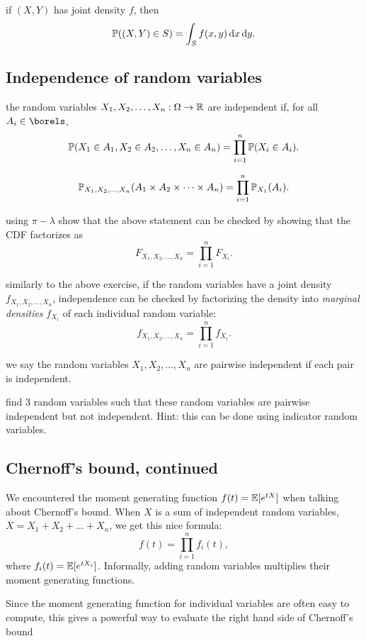 \documentclass{article}
\begin{document}
 if $(X,Y)$ has joint density $f$, then
\[ \P((X, Y) \in S) = \int_S f(x,y) \ud x \ud y. \]


\subsection{Independence of random variables}


 the random variables $X_1, X_2, \dots, X_n : \Omega \to \R$ are independent if, for all $A_i \in \borels$, \[ \P(X_1 \in A_1, X_2 \in A_2, \dots, X_n \in A_n) = \prod_{i=1}^n \P(X_i \in A_i). \]

 \[ \P_{X_1, X_2, \dots, X_n}(A_1 \times A_2 \times \dots \times A_n) = \prod_{i=1}^n \P_{X_1}(A_i). \]

 using $\pi-\lambda$ show that the above statement can be checked by showing that the CDF factorizes as 
\[ F_{X_1, X_2, \dots, X_n} = \prod_{i=1}^n F_{X_i}. \]

 similarly to the above exercise, if the random variables have a joint density $f_{X_1, X_2, \dots, X_n}$, independence can be checked by factorizing the density into \emph{marginal densities} $f_{X_i}$ of each individual random variable:
\[ f_{X_1, X_2, \dots, X_n} = \prod_{i=1}^n f_{X_i}. \]

 we say the random variables $X_1, X_2, \dots, X_n$ are pairwise independent if each pair is independent.

 find 3 random variables such that these random variables are pairwise independent but not independent. Hint: this can be done using indicator random variables.


\subsection{Chernoff's bound, continued}

We encountered the moment generating function $f(t) = \E[e^{tX}]$ when talking about Chernoff's bound. When $X$ is a sum of independent random variables, $X = X_1 + X_2 + \dots + X_n$, we get this nice formula:
\[ f(t) = \prod_{i=1}^n f_i(t), \]
where $f_i(t) = \E[e^{tX_i}]$. Informally, adding random variables multiplies their moment generating functions.

Since the moment generating function for individual variables are often easy to compute, this gives a powerful way to evaluate the right hand side of Chernoff's bound 
\end{document}
